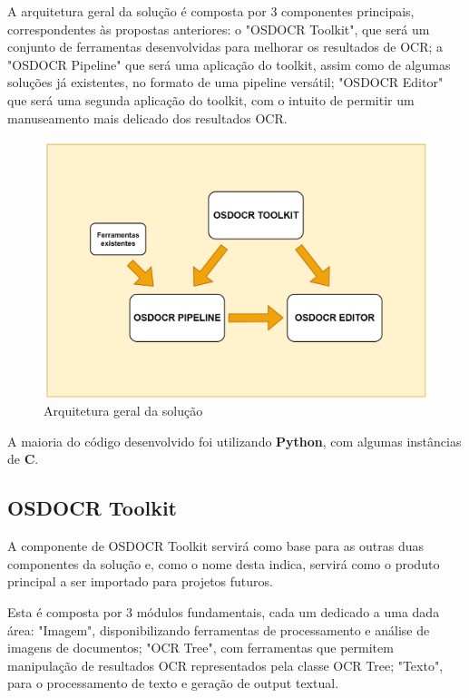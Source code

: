 A arquitetura geral da solução é composta por 3 componentes principais, correspondentes às propostas anteriores: o "OSDOCR Toolkit", que será um conjunto de ferramentas desenvolvidas para melhorar os resultados de OCR; a "OSDOCR Pipeline" que será uma aplicação do toolkit, assim como de algumas soluções já existentes, no formato de uma pipeline versátil; "OSDOCR Editor" que será uma segunda aplicação do toolkit, com o intuito de permitir um manuseamento mais delicado dos resultados OCR.

\begin{figure}[H]
	\centering
	\includegraphics[width=1\textwidth]{images/diagramas/arquitetura_geral.png}
	\caption{Arquitetura geral da solução}
	\label{fig:arquitetura_geral}
\end{figure}

A maioria do código desenvolvido foi utilizando \textbf{Python}, com algumas instâncias de \textbf{C}.

\subsection{OSDOCR Toolkit}


A componente de OSDOCR Toolkit servirá como base para as outras duas componentes da solução e, como o nome desta indica, servirá como o produto principal a ser importado para projetos futuros.

Esta é composta por 3 módulos fundamentais, cada um dedicado a uma dada área: "Imagem", disponibilizando ferramentas de processamento e análise de imagens de documentos; "OCR Tree", com ferramentas que permitem manipulação de resultados OCR representados pela classe OCR Tree; "Texto", para o processamento de texto e geração de output textual.

